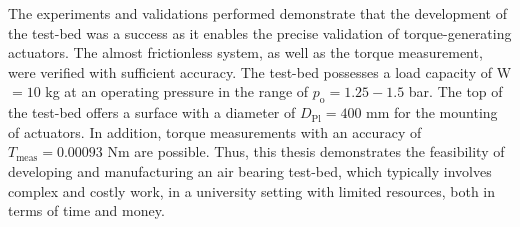 The experiments and validations performed demonstrate that the development of the test-bed  was a success as it enables the precise validation of torque-generating actuators. The almost frictionless system, as well as the torque measurement, were verified with sufficient accuracy. The test-bed possesses a load capacity of W$= 10$ kg at an operating pressure in the range of $p_\text{o} = 1.25 - 1.5$ bar. The top of the test-bed offers a surface with a diameter of $D_\text{Pl} = 400$ mm for the mounting of actuators. In addition, torque measurements with an accuracy of $T_\text{meas} = 0.00093$ Nm are possible. Thus, this thesis demonstrates the feasibility of developing and manufacturing an air bearing test-bed, which typically involves complex and costly work, in a university setting with limited resources, both in terms of time and money.
